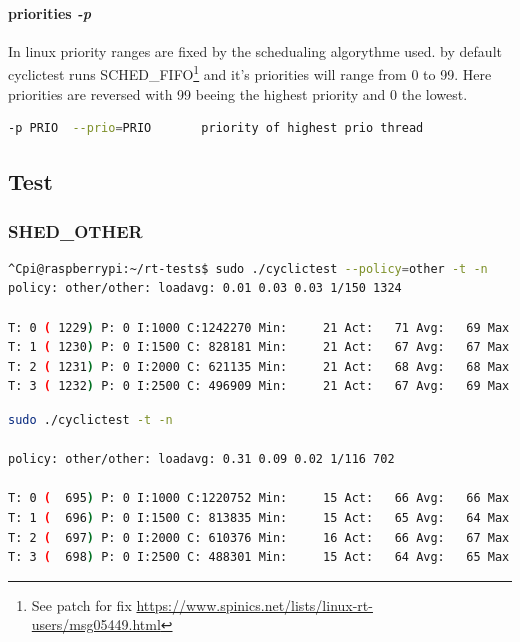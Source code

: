 \documentclass[10pt,a4paper]{article}
\begin{document}
\paragraph{priorities \emph{-p}}
In linux priority ranges are fixed by the schedualing algorythme used. by default cyclictest runs SCHED\_FIFO\footnote{See patch for fix \url{https://www.spinics.net/lists/linux-rt-users/msg05449.html}} and it's priorities will range from 0 to 99. Here priorities are reversed with 99 beeing the highest priority and 0 the lowest.
\begin{lstlisting}[language=bash,caption={cyclictest -h}]
-p PRIO  --prio=PRIO       priority of highest prio thread
\end{lstlisting}
\subsection{Test}
\subsubsection{SHED\_OTHER}

\begin{lstlisting}[language=bash,caption={preempt-rt kernel}]
^Cpi@raspberrypi:~/rt-tests$ sudo ./cyclictest --policy=other -t -n
policy: other/other: loadavg: 0.01 0.03 0.03 1/150 1324          

T: 0 ( 1229) P: 0 I:1000 C:1242270 Min:     21 Act:   71 Avg:   69 Max:    2541
T: 1 ( 1230) P: 0 I:1500 C: 828181 Min:     21 Act:   67 Avg:   67 Max:    1991
T: 2 ( 1231) P: 0 I:2000 C: 621135 Min:     21 Act:   68 Avg:   68 Max:    4476
T: 3 ( 1232) P: 0 I:2500 C: 496909 Min:     21 Act:   67 Avg:   69 Max:    3180
\end{lstlisting}
\begin{lstlisting}[language=bash,caption={volontary kernel}]
sudo ./cyclictest -t -n

policy: other/other: loadavg: 0.31 0.09 0.02 1/116 702          

T: 0 (  695) P: 0 I:1000 C:1220752 Min:     15 Act:   66 Avg:   66 Max:     528
T: 1 (  696) P: 0 I:1500 C: 813835 Min:     15 Act:   65 Avg:   64 Max:     490
T: 2 (  697) P: 0 I:2000 C: 610376 Min:     16 Act:   66 Avg:   67 Max:    1354
T: 3 (  698) P: 0 I:2500 C: 488301 Min:     15 Act:   64 Avg:   65 Max:     545

\end{lstlisting}
\end{document}

